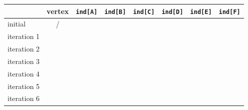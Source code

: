 \begin{table}[htbp]
    \begin{center}
        \begin{tabular}{|l|c|l|l|l|l|l|l|}
            \hline
            & vertex & \texttt{ind[A]}    & \texttt{ind[B]}    & \texttt{ind[C]}    & \texttt{ind[D]}    & \texttt{ind[E]} & \texttt{ind[F]}\\ \hline
            initial     & /      & \textcolor{blue}{} & \textcolor{blue}{} & \textcolor{blue}{} & \textcolor{blue}{} & \textcolor{blue}{} & \textcolor{blue}{}   \\ \hline
            iteration 1 &        & \textcolor{blue}{} & \textcolor{blue}{} & \textcolor{blue}{} & \textcolor{blue}{} & \textcolor{blue}{} & \textcolor{blue}{}   \\ \hline
            iteration 2 &        & \textcolor{blue}{} & \textcolor{blue}{} & \textcolor{blue}{} & \textcolor{blue}{} & \textcolor{blue}{} & \textcolor{blue}{}   \\ \hline
            iteration 3 &        & \textcolor{blue}{} & \textcolor{blue}{} & \textcolor{blue}{} & \textcolor{blue}{} & \textcolor{blue}{} & \textcolor{blue}{}   \\ \hline
            iteration 4 &        & \textcolor{blue}{} & \textcolor{blue}{} & \textcolor{blue}{} & \textcolor{blue}{} & \textcolor{blue}{} & \textcolor{blue}{}   \\ \hline
            iteration 5 &        & \textcolor{blue}{} & \textcolor{blue}{} & \textcolor{blue}{} & \textcolor{blue}{} & \textcolor{blue}{} & \textcolor{blue}{}   \\ \hline
            iteration 6 &        & \textcolor{blue}{} & \textcolor{blue}{} & \textcolor{blue}{} & \textcolor{blue}{} & \textcolor{blue}{} & \textcolor{blue}{}   \\ \hline
        \end{tabular}
    \end{center}\label{tab:Topological_Sort_Answer}
\end{table}
\vspace{0.5cm}



